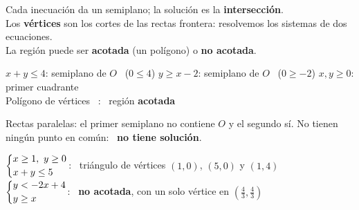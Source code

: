 \documentclass[11pt,a4paper]{article}
\makeatletter
\newcommand{\eixos}[4]{\draw[fmmuted!22,line width=0.4pt] (#1,#3) grid (#2,#4);
  \draw[-{Latex[length=2mm]},fmmuted,line width=0.8pt] (#1-0.2,0)--(#2+0.4,0) node[right,font=\small]{$x$};
  \draw[-{Latex[length=2mm]},fmmuted,line width=0.8pt] (0,#3-0.2)--(0,#4+0.4) node[above,font=\small]{$y$};}
\newcommand{\sis}[2]{\left\{\begin{array}{@{}l@{}}#1\\[2pt]#2\end{array}\right.}
\makeatother
\begin{document}
\vfill
\begin{minipage}[c]{0.5\linewidth}
\begin{idea}
Cada inecuación da un semiplano; la solución es la \textbf{intersección}.\\[3pt]
Los \textbf{vértices} son los cortes de las rectas frontera: resolvemos los sistemas de dos ecuaciones.\\[3pt]
La región puede ser \textbf{acotada} (un polígono) o \textbf{no acotada}.
\end{idea}
\end{minipage}\hfill
\begin{minipage}[c]{0.47\linewidth}\centering
{}
\end{minipage}

\vfill
\begin{exemple}[Ejemplo: \ $x+y\le4$, \ $y\ge x-2$, \ $x\ge0$, \ $y\ge0$]
$x+y\le4$: semiplano de $O$ \ ($0\le4$) \qquad $y\ge x-2$: semiplano de $O$ \ ($0\ge-2$) \qquad $x,y\ge0$: primer cuadrante\\[3pt]
Polígono de vértices \ : \ región \textbf{acotada}
\end{exemple}

\vfill
\begin{exemple}[Ejemplo: \ $x+y\ge4$ \ y \ $x+y\le1$]
Rectas paralelas: el primer semiplano no contiene $O$ y el segundo sí. No tienen ningún punto en común: \ \textbf{no tiene solución}.
\end{exemple}

\vfill
\begin{exemple}[Ejemplos]
$\sis{x\ge1,\ y\ge0}{x+y\le5}$: \ triángulo de vértices $(1,0)$, $(5,0)$ y $(1,4)$\\[5pt]
$\sis{y<-2x+4}{y\ge x}$: \ \textbf{no acotada}, con un solo vértice en $\left(\frac43,\frac43\right)$
\end{exemple}
\end{document}
